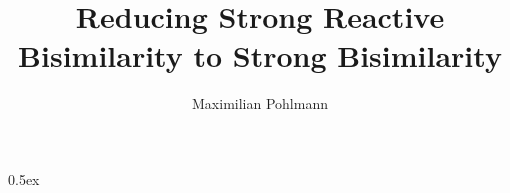 \documentclass[11pt,a4paper,openany]{book}
\begin{document}
\title{Reducing Strong Reactive Bisimilarity to Strong Bisimilarity}
\author{Maximilian Pohlmann}



\newpage\null\thispagestyle{empty}\newpage

\tableofcontents
\newpage\null\thispagestyle{empty}\newpage


\parindent 0pt\parskip 0.5ex
















{


}

\appendix




\newpage\null\thispagestyle{empty}

\newpage


\newpage
{}
%

\end{document}

